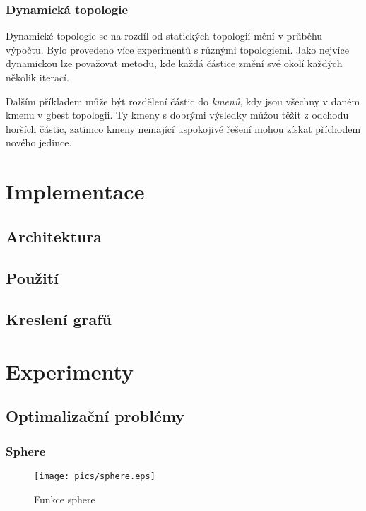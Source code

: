 \documentclass[12pt,a4paper,fleqn]{article}
\begin{document}
\subsubsection{Dynamická topologie}
Dynamické topologie se na rozdíl od statických topologií mění v průběhu výpočtu.  Bylo provedeno více experimentů s různými topologiemi. Jako nejvíce dynamickou lze považovat metodu, kde každá částice změní své okolí každých několik iterací. 

Dalším příkladem může být rozdělení částic do \textit{kmenů}, kdy jsou všechny v daném kmenu v gbest topologii. Ty kmeny s dobrými výsledky můžou těžit z odchodu horších částic, zatímco kmeny nemající uspokojivé řešení mohou získat příchodem nového jedince.
\section{Implementace} \label{implementace}
\blindtext

\subsection{Architektura}
\blindtext

\subsection{Použití}
\blindtext

\subsection{Kreslení grafů}
\blindtext

\section{Experimenty} \label{experimenty}
\blindtext

\subsection{Optimalizační problémy}
\blindtext

\subsubsection*{Sphere}
\blindtext
\begin{figure*}[h]
\centering
\texttt{[image: pics/sphere.eps]}
\caption{Funkce sphere}
\end{figure*}
\end{document}
